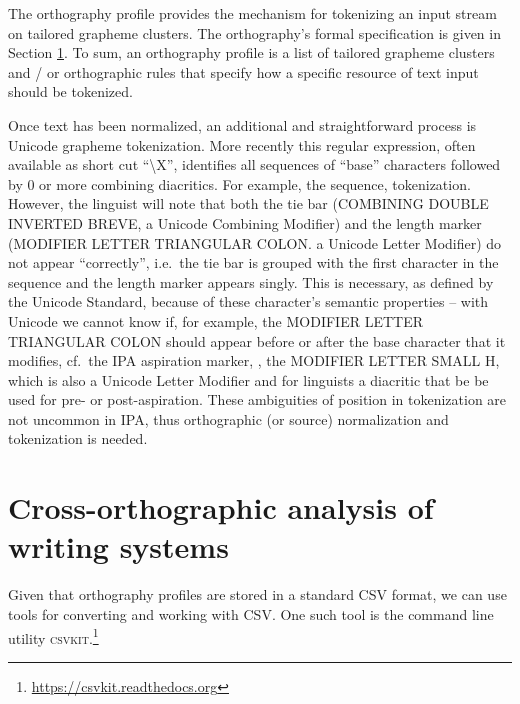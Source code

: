 The orthography profile provides the mechanism for tokenizing an input stream on tailored grapheme clusters. The orthography's formal specification is given in Section \ref{}. To sum, an orthography profile is a list of tailored grapheme clusters and / or orthographic rules that specify how a specific resource of text input should be tokenized. 

Once text has been normalized, an additional and straightforward process is Unicode grapheme tokenization. More recently this regular expression, often available as short cut ``\textbackslash{X}'', identifies all sequences of ``base'' characters followed by 0 or more combining diacritics. For example, the sequence, %
tokenization. However, the linguist will note that both the tie bar (COMBINING DOUBLE INVERTED BREVE, a Unicode Combining Modifier) and the length marker (MODIFIER LETTER TRIANGULAR COLON. a Unicode Letter Modifier) do not appear ``correctly'', i.e.~the tie bar is grouped with the first character in the sequence and the length marker appears singly. This is necessary, as defined by the Unicode Standard, because of these character's semantic properties -- with Unicode we cannot know if, for example, the MODIFIER LETTER TRIANGULAR COLON should appear before or after the base character that it modifies, cf.~the IPA aspiration marker, , the MODIFIER LETTER SMALL H, which is also a Unicode Letter Modifier and for linguists a diacritic that be be used for pre- or post-aspiration. These ambiguities of position in tokenization are not uncommon in IPA, thus orthographic (or source) normalization and tokenization is needed.

\section{Cross-orthographic analysis of writing systems}

Given that orthography profiles are stored in a standard CSV format, we can use tools for converting and working with CSV. One such tool is the command line utility \textsc{csvkit}.\footnote{\url{https://csvkit.readthedocs.org}}


